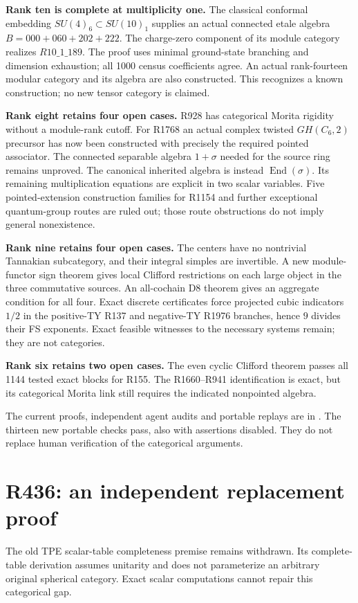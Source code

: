 \documentclass[11pt,a4paper]{article}
\begin{document}
\textbf{Rank ten is complete at multiplicity one.}
The classical conformal embedding $SU(4)_6\subset SU(10)_1$ supplies
an actual connected etale algebra $B=000+060+202+222$. The charge-zero
component of its module category realizes $R10\_1\_189$. The proof uses
minimal ground-state branching and dimension exhaustion; all 1000 census
coefficients agree. An actual rank-fourteen modular category and its
algebra are also constructed. This recognizes a known construction;
no new tensor category is claimed.

\textbf{Rank eight retains four open cases.}
R928 has categorical Morita rigidity without a module-rank cutoff.
For R1768 an actual complex twisted $GH(C_6,2)$ precursor has now been
constructed with precisely the required pointed associator. The
connected separable algebra $1+\sigma$ needed for the source ring remains
unproved. The canonical inherited algebra is instead
$\operatorname{End}(\sigma)$. Its remaining multiplication equations are
explicit in two scalar variables. Five pointed-extension construction
families for R1154 and further exceptional quantum-group routes are ruled
out; those route obstructions do not imply general nonexistence.

\textbf{Rank nine retains four open cases.}
The centers have no nontrivial Tannakian subcategory, and their integral
simples are invertible. A new module-functor sign theorem gives local
Clifford restrictions on each large object in the three commutative
sources. An all-cochain D8 theorem gives an aggregate condition for all
four. Exact discrete certificates force projected cubic indicators
$1/2$ in the positive-TY R137 and negative-TY R1976 branches, hence $9$
divides their FS exponents. Exact feasible witnesses to the necessary
systems remain; they are not categories.

\textbf{Rank six retains two open cases.}
The even cyclic Clifford theorem passes all 1144 tested exact blocks
for R155. The R1660--R941 identification is exact, but its categorical
Morita link still requires the indicated nonpointed algebra.

The current proofs, independent agent audits and portable replays are in
. The thirteen new portable
checks pass, also with assertions disabled. They do not replace human
verification of the categorical arguments.

\section{R436: an independent replacement proof}
The old TPE scalar-table completeness premise remains withdrawn. Its
complete-table derivation assumes unitarity and does not parameterize
an arbitrary original spherical category. Exact scalar computations
cannot repair this categorical gap.
\end{document}
